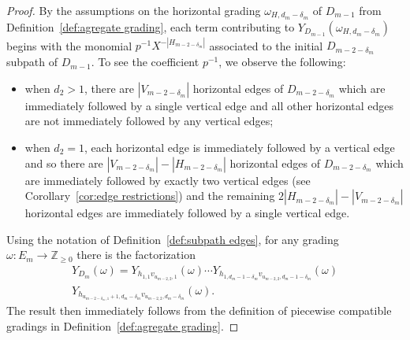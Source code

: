 \documentclass[ALCO,ThmDefs,Unicode,epreuves]{cedram}
\newcommand{\ZZ}{\mathbb{Z}}
\begin{document}
\begin{proof}
 By the assumptions on the horizontal grading $\omega_{H,d_m-\delta_m}$ of $D_{m-1}$ from Definition~\ref{def:agregate grading}, each term contributing to $Y_{D_{m-1}}(\omega_{H,d_m-\delta_m})$ begins with the monomial $p^{-1}X^{-|H_{m-2-\delta_m}|}$ associated to the initial $D_{m-2-\delta_m}$ subpath of $D_{m-1}$. 
 To see the coefficient $p^{-1}$, we observe the following:
 \begin{itemize}
 \item when $d_2>1$, there are $|V_{m-2-\delta_m}|$ horizontal edges of $D_{m-2-\delta_m}$ which are immediately followed by a single vertical edge and all other horizontal edges are not immediately followed by any vertical edges;
 \item when $d_2=1$, each horizontal edge is immediately followed by a vertical edge and so there are $|V_{m-2-\delta_m}|-|H_{m-2-\delta_m}|$ horizontal edges of $D_{m-2-\delta_m}$ which are immediately followed by exactly two vertical edges (see Corollary~\ref{cor:edge restrictions}) and the remaining $2|H_{m-2-\delta_m}|-|V_{m-2-\delta_m}|$ horizontal edges are immediately followed by a single vertical edge.
 \end{itemize}

 Using the notation of Definition~\ref{def:subpath edges}, for any grading $\omega:E_m\to\ZZ_{\ge0}$ there is the factorization
 \begin{multline*}
 Y_{D_m}(\omega)=Y_{h_{1,1}v_{u_{m-2,2},1}}(\omega)\cdots Y_{h_{1,d_m-1-\delta_m}v_{u_{m-2,2},d_m-1-\delta_m}}(\omega)\\
 Y_{h_{u_{m-2-\delta_m,1}+1,d_m-\delta_m}v_{u_{m-2,2},d_m-\delta_m}}(\omega).
 \end{multline*}
 The result then immediately follows from the definition of piecewise compatible gradings in Definition~\ref{def:agregate grading}.
\end{proof}
\end{document}

